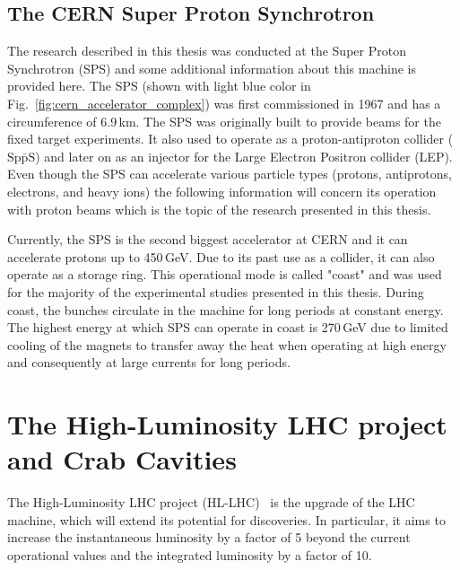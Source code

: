 \subsection{The CERN Super Proton Synchrotron}\label{subsec:cern_sps}
 The research described in this thesis was conducted at the Super Proton Synchrotron (SPS) and some additional information about this machine is provided here. The SPS (shown with light blue color in Fig.~\ref{fig:cern_accelerator_complex}) was first commissioned in 1967 and has a circumference of 6.9\,km. The SPS was originally built to provide beams for the fixed target experiments.  It also used to operate as a proton-antiproton collider ($\mathrm{Sp\bar{p}S}$) and later on as an injector for the Large Electron Positron collider (LEP).%
 Even though the SPS can accelerate various particle types (protons, antiprotons, electrons, and heavy ions) the following information will concern its operation with proton beams which is the topic of the research presented in this thesis.

 Currently, the SPS is the second biggest accelerator at CERN and it can accelerate protons up to 450\,GeV. Due to its past use as a collider, it can also operate as a storage ring. This operational mode is called "coast" and was used for the majority of the experimental studies presented in this thesis. During coast, the bunches circulate in the machine for long periods at constant energy. The highest energy at which SPS can operate in coast is 270\,GeV due to limited cooling of the magnets to transfer away the heat when operating at high energy and consequently at large currents for long periods.

 

\section{The High-Luminosity LHC project and Crab Cavities}
The High-Luminosity LHC project (HL-LHC)~\cite{HL_LHC_yellow_report, Brning2015} is the upgrade of the LHC machine, which will extend its potential for discoveries. In particular, it aims to increase the instantaneous luminosity by a factor of 5 beyond the current operational values and the integrated luminosity by a factor of 10. 

